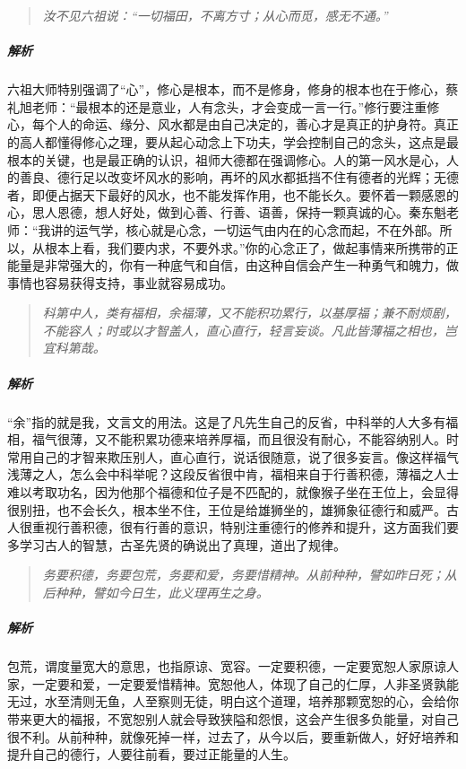 \begin{quote}\it
    汝不见六祖说：“一切福田，不离方寸；从心而觅，感无不通。”
\end{quote}

\subparagraph{解析} 六祖大师特别强调了“心”，修心是根本，而不是修身，修身的根本也在于修心，蔡礼旭老师：“最根本的还是意业，人有念头，才会变成一言一行。”修行要注重修心，每个人的命运、缘分、风水都是由自己决定的，善心才是真正的护身符。真正的高人都懂得修心之理，要从起心动念上下功夫，学会控制自己的念头，这点是最根本的关键，也是最正确的认识，祖师大德都在强调修心。人的第一风水是心，人的善良、德行足以改变坏风水的影响，再坏的风水都抵挡不住有德者的光辉；无德者，即便占据天下最好的风水，也不能发挥作用，也不能长久。要怀着一颗感恩的心，思人恩德，想人好处，做到心善、行善、语善，保持一颗真诚的心。秦东魁老师：“我讲的运气学，核心就是心念，一切运气由内在的心念而起，不在外部。所以，从根本上看，我们要内求，不要外求。”你的心念正了，做起事情来所携带的正能量是非常强大的，你有一种底气和自信，由这种自信会产生一种勇气和魄力，做事情也容易获得支持，事业就容易成功。

\begin{quote}\it
    科第中人，类有福相，余福薄，又不能积功累行，以基厚福；兼不耐烦剧，不能容人；时或以才智盖人，直心直行，轻言妄谈。凡此皆薄福之相也，岂宜科第哉。
\end{quote}

\subparagraph{解析} “余”指的就是我，文言文的用法。这是了凡先生自己的反省，中科举的人大多有福相，福气很薄，又不能积累功德来培养厚福，而且很没有耐心，不能容纳别人。时常用自己的才智来欺压别人，直心直行，说话很随意，说了很多妄言。像这样福气浅薄之人，怎么会中科举呢？这段反省很中肯，福相来自于行善积德，薄福之人士难以考取功名，因为他那个福德和位子是不匹配的，就像猴子坐在王位上，会显得很别扭，也不会长久，根本坐不住，王位是给雄狮坐的，雄狮象征德行和威严。古人很重视行善积德，很有行善的意识，特别注重德行的修养和提升，这方面我们要多学习古人的智慧，古圣先贤的确说出了真理，道出了规律。

\begin{quote}\it
    务要积德，务要包荒，务要和爱，务要惜精神。从前种种，譬如昨日死；从后种种，譬如今日生，此义理再生之身。
\end{quote}

\subparagraph{解析} 包荒，谓度量宽大的意思，也指原谅、宽容。一定要积德，一定要宽恕人家原谅人家，一定要和爱，一定要爱惜精神。宽恕他人，体现了自己的仁厚，人非圣贤孰能无过，水至清则无鱼，人至察则无徒，明白这个道理，培养那颗宽恕的心，会给你带来更大的福报，不宽恕别人就会导致狭隘和怨恨，这会产生很多负能量，对自己很不利。从前种种，就像死掉一样，过去了，从今以后，要重新做人，好好培养和提升自己的德行，人要往前看，要过正能量的人生。

